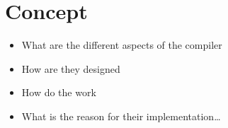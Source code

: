 \chapter{Concept}
\begin{itemize}
    \item What are the different aspects of the compiler
    \item How are they designed
    \item How do the work
    \item What is the reason for their implementation\dots
\end{itemize}



